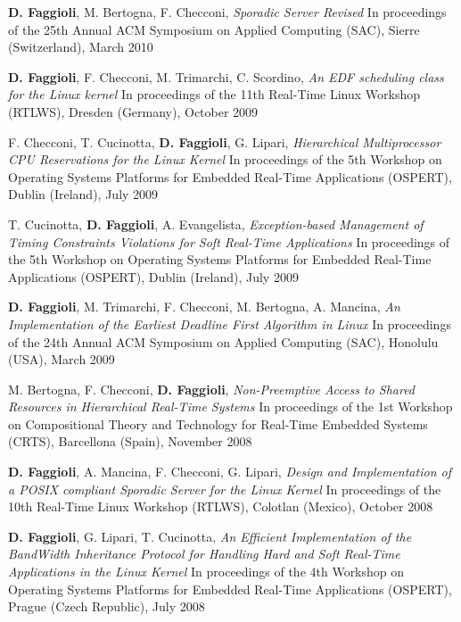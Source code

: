 \documentclass[english,a4paper]{europasscv}
\begin{document}
\begin{europasscv}
{\begin{ecvitemize}
      \item \textbf{D. Faggioli}, M. Bertogna, F. Checconi, \textit{Sporadic Server Revised} In proceedings of the 25th Annual ACM Symposium on Applied Computing (SAC), Sierre (Switzerland), March 2010
      \item \textbf{D. Faggioli}, F. Checconi, M. Trimarchi, C. Scordino, \textit{An EDF scheduling class for the Linux kernel} In proceedings of the 11th Real-Time Linux Workshop (RTLWS), Dresden (Germany), October 2009
      \item F. Checconi, T. Cucinotta, \textbf{D. Faggioli}, G. Lipari, \textit{Hierarchical Multiprocessor CPU Reservations for the Linux Kernel} In proceedings of the 5th Workshop on Operating Systems Platforms for Embedded Real-Time Applications (OSPERT), Dublin (Ireland), July 2009
      \item T. Cucinotta, \textbf{D. Faggioli}, A. Evangelista, \textit{Exception-based Management of Timing Constraints Violations for Soft Real-Time Applications} In proceedings of the 5th Workshop on Operating Systems Platforms for Embedded Real-Time Applications (OSPERT), Dublin (Ireland), July 2009
      \item \textbf{D. Faggioli}, M. Trimarchi, F. Checconi, M. Bertogna, A. Mancina, \textit{An Implementation of the Earliest Deadline First Algorithm in Linux} In proceedings of the 24th Annual ACM Symposium on Applied Computing (SAC), Honolulu (USA), March 2009
      \item M. Bertogna, F. Checconi, \textbf{D. Faggioli}, \textit{Non-Preemptive Access to Shared Resources in Hierarchical Real-Time Systems} In proceedings of the 1st Workshop on Compositional Theory and Technology for Real-Time Embedded Systems (CRTS), Barcellona (Spain), November 2008
      \item \textbf{D. Faggioli}, A. Mancina, F. Checconi, G. Lipari, \textit{Design and Implementation of a POSIX compliant Sporadic Server for the Linux Kernel} In proceedings of the 10th Real-Time Linux Workshop (RTLWS), Colotlan (Mexico), October 2008
      \item \textbf{D. Faggioli}, G. Lipari, T. Cucinotta, \textit{An Efficient Implementation of the BandWidth Inheritance Protocol for Handling Hard and Soft Real-Time Applications in the Linux Kernel} In proceedings of the 4th Workshop on Operating Systems Platforms for Embedded Real-Time Applications (OSPERT), Prague (Czech Republic), July 2008
    \end{ecvitemize}
  }

  \end{europasscv}
\end{document}
